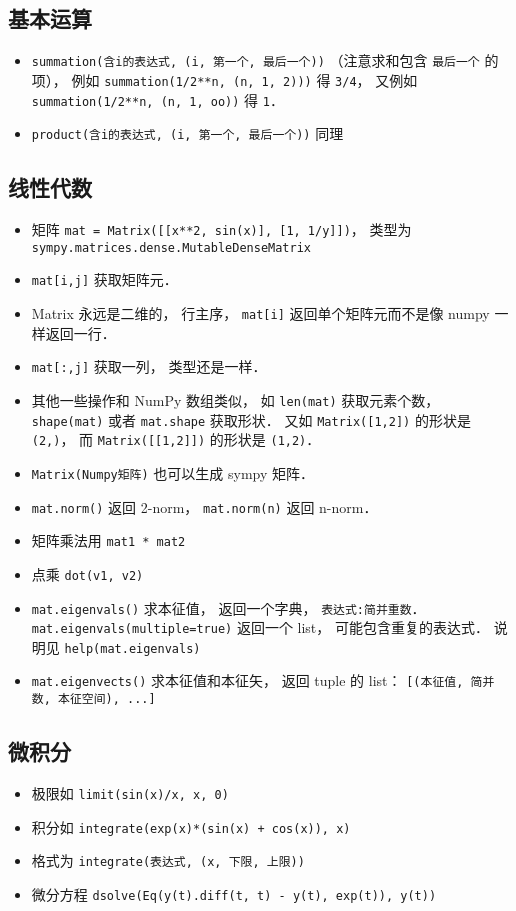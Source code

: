 \subsection{基本运算}
\begin{itemize}
\item \verb|summation(含i的表达式, (i, 第一个, 最后一个))| （注意求和包含 \verb|最后一个| 的项）， 例如 \verb|summation(1/2**n, (n, 1, 2)))| 得 \verb|3/4|， 又例如 \verb|summation(1/2**n, (n, 1, oo))| 得 \verb|1|．
\item \verb|product(含i的表达式, (i, 第一个, 最后一个))| 同理
\end{itemize}

\subsection{线性代数}
\begin{itemize}
\item 矩阵 \verb|mat = Matrix([[x**2, sin(x)], [1, 1/y]])|， 类型为 \verb|sympy.matrices.dense.MutableDenseMatrix|
\item \verb|mat[i,j]| 获取矩阵元．
\item Matrix 永远是二维的， 行主序， \verb|mat[i]| 返回单个矩阵元而不是像 numpy 一样返回一行．
\item \verb|mat[:,j]| 获取一列， 类型还是一样．
\item 其他一些操作和 NumPy 数组类似， 如 \verb|len(mat)| 获取元素个数， \verb|shape(mat)| 或者 \verb|mat.shape| 获取形状． 又如 \verb|Matrix([1,2])| 的形状是 \verb|(2,)|， 而 \verb|Matrix([[1,2]])| 的形状是 \verb|(1,2)|．
\item \verb|Matrix(Numpy矩阵)| 也可以生成 sympy 矩阵．
\item \verb|mat.norm()| 返回 2-norm， \verb|mat.norm(n)| 返回 n-norm．
\item 矩阵乘法用 \verb|mat1 * mat2|
\item 点乘 \verb|dot(v1, v2)|
\item \verb|mat.eigenvals()| 求本征值， 返回一个字典， \verb|表达式:简并重数|． \verb|mat.eigenvals(multiple=true)| 返回一个 list， 可能包含重复的表达式． 说明见 \verb|help(mat.eigenvals)|
\item \verb|mat.eigenvects()| 求本征值和本征矢， 返回 tuple 的 list： \verb|[(本征值, 简并数, 本征空间), ...]|
\end{itemize}


\subsection{微积分}
\begin{itemize}
\item 极限如 \verb|limit(sin(x)/x, x, 0)|
\item 积分如 \verb|integrate(exp(x)*(sin(x) + cos(x)), x)|
\item 格式为 \verb|integrate(表达式, (x, 下限, 上限))|
\item 微分方程 \verb|dsolve(Eq(y(t).diff(t, t) - y(t), exp(t)), y(t))|
\end{itemize}


